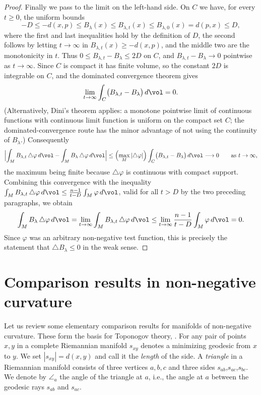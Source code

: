 \begin{proof}
Finally we pass to the limit on the left-hand side. On $C$ we have,
for every $t\ge0$, the uniform bounds
$$-D\le-d(x,p)\le B_\lambda(x)\le B_{\lambda,t}(x)\le
B_{\lambda,0}(x)=d(p,x)\le D,$$
where the first and last inequalities hold by the definition of $D$, the
second follows by letting $t\to\infty$ in
$B_{\lambda,t}(x)\ge-d(x,p)$, and the middle two are the
monotonicity in $t$. Thus $0\le B_{\lambda,t}-B_\lambda\le2D$ on
$C$, and $B_{\lambda,t}-B_\lambda\to0$ pointwise as $t\to\infty$.
Since $C$ is compact it has finite volume, so the constant $2D$ is
integrable on $C$, and the dominated convergence theorem gives
$$\lim_{t\rightarrow\infty}
\int_C\bigl(B_{\lambda,t}-B_\lambda\bigr)\,d\vol=0.$$
(Alternatively, Dini's theorem applies: a monotone pointwise limit
of continuous functions with continuous limit function is uniform
on the compact set $C$; the dominated-convergence route has the
minor advantage of not using the continuity of $B_\lambda$.)
Consequently
$$\Bigl|\int_MB_{\lambda,t}\,\triangle\varphi\,d\vol
-\int_MB_\lambda\,\triangle\varphi\,d\vol\Bigr|
\le\Bigl(\max_M|\triangle\varphi|\Bigr)
\int_C\bigl(B_{\lambda,t}-B_\lambda\bigr)\,d\vol
\longrightarrow0\qquad\text{as }t\rightarrow\infty,$$
the maximum being finite because $\triangle\varphi$ is continuous
with compact support. Combining this convergence with the
inequality
$\int_MB_{\lambda,t}\,\triangle\varphi\,d\vol
\le\frac{n-1}{t-D}\int_M\varphi\,d\vol$,
valid for all $t>D$ by the two preceding paragraphs, we obtain
$$\int_MB_\lambda\,\triangle\varphi\,d\vol
=\lim_{t\rightarrow\infty}
\int_MB_{\lambda,t}\,\triangle\varphi\,d\vol
\le\lim_{t\rightarrow\infty}\frac{n-1}{t-D}\int_M\varphi\,d\vol=0.$$
Since $\varphi$ was an arbitrary non-negative test function, this
is precisely the statement that $\triangle B_\lambda\le0$ in the
weak sense.
\end{proof}

\section{Comparison results in non-negative curvature}

Let us review some elementary comparison results for manifolds of
non-negative curvature. These form the basis for Toponogov
theory, \cite{Toponogov}. For any pair
of points $x,y$ in a complete Riemannian manifold $s_{xy}$ denotes a
minimizing geodesic from $x$ to $y$. We set $|s_{xy}|=d(x,y)$ and
call it the {\sl length} of the side. A {\sl triangle} in a
Riemannian manifold consists of three vertices $a,b,c$ and three
sides $s_{ab}$,$s_{ac}$,$s_{bc}$. We denote by $\angle_a$ the angle
of the triangle at $a$, i.e., the angle at $a$ between the geodesic
rays $s_{ab}$ and $s_{ac}$.

